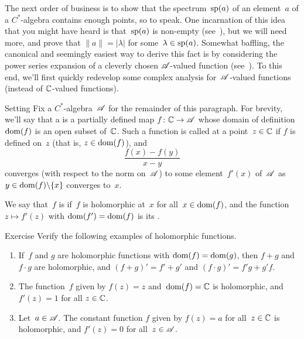 \documentclass[main]{subfiles}
\begin{document}
\begin{parsec}%
\begin{point}%
The next order of business
is to show that the spectrum~$\mathrm{sp}(a)$ of an element~$a$
of a $C^*$-algebra contains enough points, so to speak.
One incarnation of this idea that you might have heard
is that~$\mathrm{sp}(a)$ is non-empty
(see~), but
we will need more,
and prove that  $\|a\|=\left|\lambda\right|$
for some~$\lambda\in\mathrm{sp}(a)$.
Somewhat baffling,
the canonical and seemingly
easiest way to derive this fact is by considering the power series
expansion of a cleverly chosen $\mathscr{A}$-valued function
(see~).
To this end,
we'll first quickly redevelop some complex analysis
for~$\mathscr{A}$-valued functions
(instead of $\mathbb{C}$-valued functions).
\end{point}
\begin{point}{Setting}%
Fix a $C^*$-algebra~$\mathscr{A}$ for the remainder of this paragraph.
For brevity,
we'll say that a 
is a partially defined map $f\colon \mathbb{C}\to \mathscr{A}$
whose domain of definition $\operatorname{dom}(f)$ is an open subset of~$\mathbb{C}$.
Such a function is called  at a point~$z\in \mathbb{C}$
if $f$ is defined on~$z$ (that is, $z\in \operatorname{dom}(f)$),
and 
\begin{equation*}
\frac{f(x)-f(y)}{x-y}
\end{equation*}
converges (with respect to the norm on~$\mathscr{A}$)
to some element~$f'(x)$ of~$\mathscr{A}$
as $y\in \operatorname{dom}(f)\backslash\{x\}$
converges to~$x$.

We say that~$f$ is 
if~$f$ is holomorphic at~$x$ for all~$x\in \operatorname{dom}(f)$,
and the function $z\mapsto f'(z)$
with $\operatorname{dom}(f')=\operatorname{dom}(f)$
is its .
\end{point}
\begin{point}{Exercise}%
Verify the following examples of holomorphic functions.
\begin{enumerate}
\item
If~$f$ and $g$ are holomorphic functions with $\operatorname{dom}(f)=\operatorname{dom}(g)$,
then $f+g$ and $f\cdot g$ are holomorphic,
and $(f+g)'=f'+g'$ and $(f\cdot g)' = f'g+g'f$.

\item
The function~$f$ given by $f(z)=z$ and~$\operatorname{dom}(f)=\mathbb{C}$
is holomorphic, and $f'(z)=1$ for all $z\in\mathbb{C}$.

\item
Let~$a\in \mathscr{A}$. The constant function $f$ given by $f(z)=a$
for all~$z\in \mathbb{C}$ is holomorphic, and $f'(z)=0$ for all~$z\in \mathscr{A}$.


\end{enumerate}
\end{point}
\end{parsec}
\end{document}
